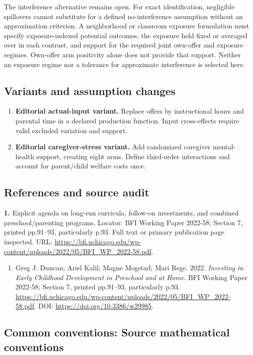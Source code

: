 \documentclass[11pt,a4paper]{article}
\begin{document}
The interference alternative remains open. For exact identification, negligible spillovers cannot substitute for a defined no-interference assumption without an approximation criterion. A neighborhood or classroom exposure formulation must specify exposure-indexed potential outcomes, the exposure held fixed or averaged over in each contrast, and support for the required joint own-offer and exposure regimes. Own-offer arm positivity alone does not provide that support. Neither an exposure regime nor a tolerance for approximate interference is selected here.
\subsection*{Variants and assumption changes}
\begin{enumerate}
\item \textbf{Editorial actual-input variant.} Replace offers by instructional hours and parental time in a declared production function. Input cross-effects require valid excluded variation and support.
\item \textbf{Editorial caregiver-stress variant.} Add randomized caregiver mental-health support, creating eight arms. Define third-order interactions and account for parent/child welfare costs once.
\end{enumerate}
\subsection*{References and source audit}
\textbf{1.} Explicit agenda on long-run curricula, follow-on investments, and combined preschool/parenting programs. Locator: BFI Working Paper 2022-58; Section 7, printed pp.91–93, particularly p.93. Full text or primary publication page inspected. URL: \url{https://bfi.uchicago.edu/wp-content/uploads/2022/05/BFI_WP_2022-58.pdf}.
\begin{enumerate}\raggedright
\item\hypertarget{definitions:source:30007733:1}{} Greg J. Duncan; Ariel Kalil; Magne Mogstad; Mari Rege. 2022. \emph{Investing in Early Childhood Development in Preschool and at Home}. BFI Working Paper 2022-58; Section 7, printed pp.91–93, particularly p.93.
\url{https://bfi.uchicago.edu/wp-content/uploads/2022/05/BFI_WP_2022-58.pdf}.
DOI: \url{https://doi.org/10.3386/w29985}.
\end{enumerate}

\subsection*{Common conventions: Source mathematical conventions}
\end{document}
